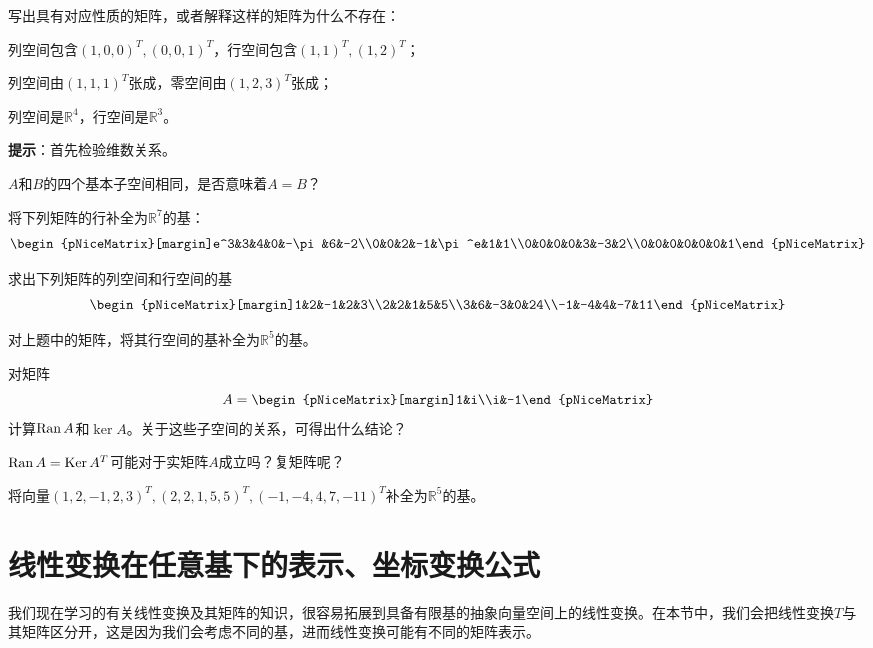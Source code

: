 \begin{problemset}
  \item 写出具有对应性质的矩阵，或者解释这样的矩阵为什么不存在：
  \begin{probenumerate}
    \item 列空间包含$(1,0,0)^T,(0,0,1)^T$，行空间包含$(1,1)^T,(1,2)^T$；
    \item 列空间由$(1,1,1)^T$张成，零空间由$(1,2,3)^T$张成；
    \item 列空间是$\mathbb{R}^4$，行空间是$\mathbb{R}^3$。
  \end{probenumerate}
  {\bf 提示}：首先检验维数关系。
  \item $A$和$B$的四个基本子空间相同，是否意味着$A=B$？
  \item 将下列矩阵的行补全为$\mathbb{R}^7$的基：\[\begin{pNiceMatrix}[margin]e^3&3&4&0&-\pi&6&-2\\0&0&2&-1&\pi^e&1&1\\0&0&0&0&3&-3&2\\0&0&0&0&0&0&1\end{pNiceMatrix}\]
  \item 求出下列矩阵的列空间和行空间的基\[\begin{pNiceMatrix}[margin]1&2&-1&2&3\\2&2&1&5&5\\3&6&-3&0&24\\-1&-4&4&-7&11\end{pNiceMatrix}\]
  \item 对上题中的矩阵，将其行空间的基补全为$\mathbb{R}^5$的基。
  \item 对矩阵\[A=\begin{pNiceMatrix}[margin]1&i\\i&-1\end{pNiceMatrix}\]计算$\operatorname{Ran} A$和$\ker A$。关于这些子空间的关系，可得出什么结论？
  \item $\operatorname{Ran} A=\operatorname{Ker} A^T$可能对于实矩阵$A$成立吗？复矩阵呢？
  \item 将向量$(1,2,-1,2,3)^{T},(2,2,1,5,5)^{T},(-1,-4,4,7,-11)^{T}$补全为$\mathbb{R}^5$的基。
\end{problemset}

\section{线性变换在任意基下的表示、坐标变换公式}\label{sec:ChangeOfCoordinate}

我们现在学习的有关线性变换及其矩阵的知识，很容易拓展到具备有限基的抽象向量空间上的线性变换。在本节中，我们会把线性变换$T$与其矩阵区分开，这是因为我们会考虑不同的基，进而线性变换可能有不同的矩阵表示。

